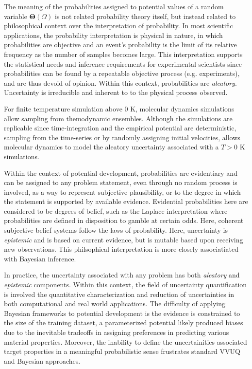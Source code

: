 The meaning of the probabilities assigned to potential values of a random variable $\bm{\Theta}(\Omega)$ is not related probability theory itself, but instead related to philosophical context over the interpretation of probability.  In most scientific applications, the probability interpretation is physical in nature, in which probabilities are objective and an event's probability is the limit of its relative frequency as the number of samples becomes large.  This interpretation supports the statistical needs and inference requirements for experimental scientists since probabilities can be found by a repeatable objective process (e.g. experiments), and are thus devoid of opinion.  Within this context, probabilities are \emph{aleatory}.  Uncertainty is irreducible and inherent to to the physical process observed.

For finite temperature simulation above $0$ K, molecular dynamics simulations allow sampling from themodynamic ensembles.  Although the simulations are replicable since time-integration and the empirical potential are deterministic, sampling from the time-series or by randomly assigning initial velocities, allows molecular dynamics to model the aleatory uncertainty associated with a $T > 0$ K simulations.

Within the context of potential development, probabilities are evidentiary and can be assigned to any problem statement, even through no random process is involved, as a way to represent subjective plausibility, or to the degree in which the statement is supported by available evidence.  Evidential probabilities here are considered to be degrees of belief, such as the Laplace interpretation where probabilities are defined in disposition to gamble at certain odds\cite{laplace1902_probability}.  Here, coherent subjective belief systems follow the laws of probability\cite{ramsey2016truth,definetti1980_foresight}.  Here, uncertainty is \emph{epistemic} and is based on current evidence, but is mutable based upon receiving new observations\cite{ramsey2016truth,definetti1980_foresight,jaynes2003_probability}.  This philsophical interpretation is more closely associatiated with Bayesian inference\cite{gelman_bayesian}.

In practice, the uncertainty associated with any problem has both \emph{aleatory} and \emph{epistemic} components.  Within this context, the field of uncertainty quantification\cite{oberkampf2010_vvuq} is involved the quantitative characterization and reduction of uncertainties in both computational and real world applications.  The difficulty of applying Bayesian frameworks to potential development is the evidence is constrained to the size of the training dataset, a parameterized potential likely produced biases due to the inevitable tradeoffs in assigning preferences in predicting various material properties.  Moreover, the inability to define the uncertainities associated target properties in a meaningful probabilistic sense frustrates standard VVUQ and Bayesian approaches.

